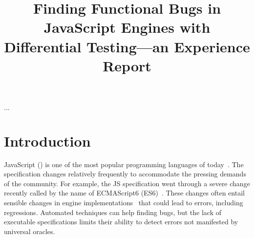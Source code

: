 \documentclass[10pt,conference,anonymous]{IEEEtran}
\begin{document}
\title{Finding Functional Bugs in JavaScript Engines with Differential
  Testing---an Experience Report}


\maketitle

\begin{abstract}
\end{abstract}

\begin{IEEEkeywords}
...
\end{IEEEkeywords}

\section{Introduction}

JavaScript (\js{}) is one of the most popular programming languages of
today~\cite{business-insider,stackify}. The \js{} specification
changes relatively frequently to accommodate the pressing demands of
the community. For example, the JS specification went through a severe
change recently called by the name of ECMAScript6
(ES6)~\cite{es6-features}.  These changes often entail sensible
changes in engine implementations~\cite{kangax} that could lead to
errors, including regressions. Automated techniques can help finding
bugs, but the lack of executable specifications limits their ability
to detect errors not manifested by universal oracles.
\end{document}

